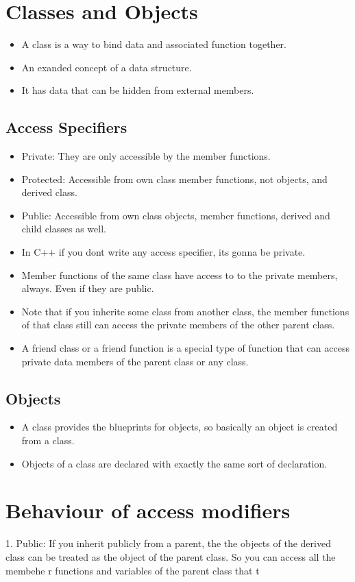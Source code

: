 \documentclass[11pt]{article}
\begin{document}
\section{Classes and Objects}

\begin{itemize}
	\item A class is a way to bind data and associated function together. 
	\item An exanded concept of a data structure.
	\item It has data that can be hidden from external members.
\end{itemize}

\subsection{Access Specifiers}
\begin{itemize}
	\item Private: They are only accessible by the member functions. 
	\item Protected: Accessible from own class member functions, not objects, and derived class.
	\item Public: Accessible from own class objects, member functions, derived and child classes as well. 
	\item In C++ if you dont write any access specifier, its gonna be private. 
	\item Member functions of the same class have access to to the private members, always. Even if they are public. 
	\item Note that if you inherite some class from another class, the member functions of that class still can access the private members of the other parent class. 
	\item A friend class or a friend function is a special type of function that can access private data members of the parent class or any class. 
\end{itemize}

\subsection{Objects}
\begin{itemize}
	\item A class provides the blueprints for objects, so basically an object is created from a class. 
	\item Objects of a class are declared with exactly the same sort of declaration. 
\end{itemize}

\section{Behaviour of access modifiers}

1. Public: If you inherit publicly from a parent, the the objects of the derived class can be treated as the object of the parent class. So you can access all the membehe r functions and variables of the parent class that t
\end{document}
